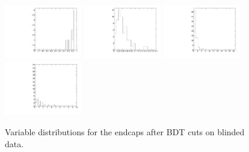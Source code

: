 \begin{figure}
  \includegraphics[width=0.3\textwidth]{Figures/AfterBDTCut_iso_EndcapsUnblinded.pdf}
  \includegraphics[width=0.3\textwidth]{Figures/AfterBDTCut_docatrk_EndcapsUnblinded.pdf}
  \includegraphics[width=0.3\textwidth]{Figures/AfterBDTCut_closetrk_EndcapsUnblinded.pdf}
  \includegraphics[width=0.3\textwidth]{Figures/AfterBDTCut_chi2dof_EndcapsUnblinded.pdf}
  \caption{Variable distributions for the endcaps after BDT cuts on blinded data.}
  \label{fig:massPlotUnblinded}
\end{figure}
